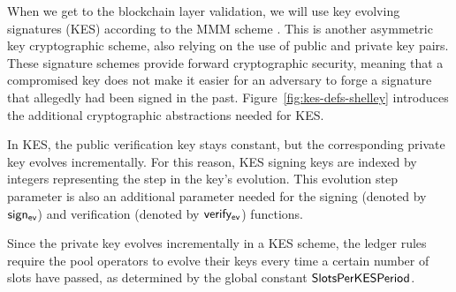 When we get to the blockchain layer validation, we will use
key evolving signatures (KES) according to the MMM scheme \cite{cryptoeprint:2001:034}.
This is another asymmetric key cryptographic scheme, also relying on
the use of public and private key pairs.
These signature schemes provide forward cryptographic security, meaning that a
compromised key does not make it easier for an adversary to forge a signature that
allegedly had been signed in the past.
Figure~\ref{fig:kes-defs-shelley} introduces the additional cryptographic abstractions
needed for KES.

In KES, the public verification key stays constant, but the
corresponding private key evolves incrementally. For this reason, KES
signing keys are indexed by integers representing the step in the key's
evolution. This evolution step parameter is also an additional parameter needed
for the signing (denoted by $\mathsf{sign_{ev}}$) and verification
(denoted by $\mathsf{verify_{ev}}$) functions.

Since the private key evolves incrementally in a KES scheme, the ledger rules
require the pool operators to evolve their keys every time a certain number of
slots have passed, as determined by the global constant $\mathsf{SlotsPerKESPeriod}$.

